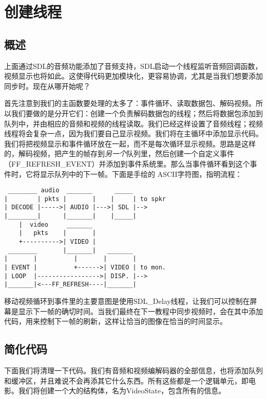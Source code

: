 ﻿\chapter{创建线程}
\label{ch4}
\section{概述}

上面通过SDL的音频功能添加了音频支持，SDL启动一个线程监听音频回调函数，视频显示也将如此。这使得代码更加模块化，更容易协调，尤其是当我们想要添加同步时。现在从哪开始呢？

首先注意到我们的主函数要处理的太多了：事件循环、读取数据包、解码视频。所以我们要做的是分开它们：创建一个负责解码数据包的线程；然后将数据包添加到队列中，并由相应的音频和视频的线程读取。我们已经这样设置了音频线程；视频线程将会复杂一点，因为我们要自己显示视频。我们将在主循环中添加显示代码。我们将把视频显示和事件循环放在一起，而不是每次循环显示视频。思路是这样的，解码视频，把产生的帧存到\emph{另一个}队列里，然后创建一个自定义事件 （FF_REFRESH_EVENT）并添加到事件系统里。那么当事件循环看到这个事件时，它将显示队列中的下一帧。下面是手绘的 ASCII字符图，指明流程：

\newpage
\begin{verbatim}
 ________ audio  _______      _____
|        | pkts |       |    |     | to spkr
| DECODE |----->| AUDIO |--->| SDL |-->
|________|      |_______|    |_____|
    |  video     _______
    |   pkts    |       |
    +---------->| VIDEO |
 ________       |_______|   _______
|       |          |       |       |
| EVENT |          +------>| VIDEO | to mon.
| LOOP  |----------------->| DISP. |-->
|_______|<---FF_REFRESH----|_______|
\end{verbatim}

移动视频循环到事件里的主要意图是使用SDL_Delay线程，让我们可以控制在屏幕是显示下一帧的确切时间。当我们最终在下一教程中同步视频时，会在其中添加代码，用来控制下一帧的刷新，这样让恰当的图像在恰当的时间显示。

\section{简化代码}

下面我们将清理一下代码。我们有音频和视频编解码器的全部信息，也将添加队列和缓冲区，并且难说不会再添其它什么东西。所有这些都是一个逻辑单元，即电影。我们将创建一个大的结构体，名为VideoState，包含所有的信息。


